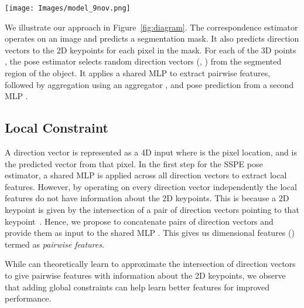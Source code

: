 \documentclass{article}
\begin{document}
\begin{figure*}[t]
\centering
\texttt{[image: Images/model\_9nov.png]}
\caption{Illustration of our network architecture (SSPE-ours). The correspondence estimator predicts direction vectors to the 2D keypoints. Pairs of direction vectors are passed through a shared network  to give pairwise features which are aggregated using an aggregator , and passed through a second network  to predict the pose. The color of the pairwise features indicates association to a 3D point.}
\label{fig:diagram}
\end{figure*}














We illustrate our approach in Figure~\ref{fig:diagram}. The correspondence estimator operates on an image and predicts a segmentation mask. It also predicts direction vectors to the 2D keypoints for each pixel in the mask. For each of the  3D points , the pose estimator selects  random direction vectors  (, ) from the segmented region of the object. It applies a shared MLP  to extract pairwise features, followed by aggregation using an aggregator , and pose prediction from a second MLP .






\subsection{Local Constraint}



A direction vector  is represented as a 4D input  where  is the pixel location, and  is the predicted vector from that pixel. In the first step for the SSPE pose estimator, a shared MLP is applied across all direction vectors to extract  local features. 
However, 
by operating on every direction vector independently the local features do not have information about the 2D keypoints. This is because a 2D keypoint is given by the intersection of a pair of direction vectors pointing to that keypoint~\cite{peng2019pvnet}. Hence, we propose to concatenate pairs of direction vectors  and provide them as input to the shared MLP . This gives us   dimensional
features  () termed as \textit{pairwise features}.


While  can theoretically learn to approximate the intersection of direction vectors to give pairwise features with information about the 2D keypoints, we observe that adding global constraints can help learn better features for improved performance.
\end{document}
